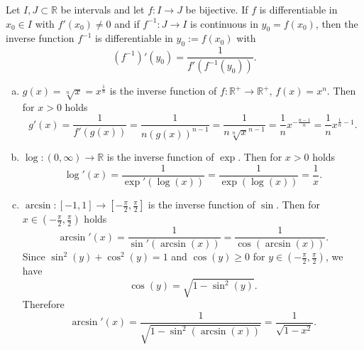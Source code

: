 

\begin{Theorem}
    Let $I,J\subset\mathbb{R}$ be intervals and let $f:I\to J$ be bijective. If $f$ is differentiable in $x_0\in I$ with $f'(x_0)\neq0$ 
and if $f^{-1}:J\to I$ is continuous in $y_0=f(x_0)$,
then the inverse function $f^{-1}$ is differentiable in $y_0:=f(x_0)$ with
\[\left(f^{-1}\right)'(y_0)=\frac{1}{f'(f^{-1}(y_0))}.\]
\end{Theorem}

\begin{example}
\begin{enumerate}[a)]
    \item $g(x)=\sqrt[n]{x}=x^{\frac{1}{n}}$ is the inverse function of $f:\mathbb{R}^+\to\mathbb{R}^+$, $f(x)=x^n$. Then for $x>0$ holds
\[g'(x)=\frac{1}{f'(g(x))}=\frac{1}{n(g(x))^{n-1}}=\frac{1}{n\sqrt[n]{x}^{n-1}}=\frac1nx^{-\frac{n-1}{n}}=\frac1nx^{\frac{1}{n}-1}.\]
\item $\log: (0,\infty)\to\mathbb{R}$ is the inverse function of $\exp$. Then for $x>0$ holds
\[\log'(x)=\frac1{\exp'(\log(x))}=\frac1{\exp(\log(x))}=\frac1{x}.\]
\item $\arcsin:[-1,1]\to[-\frac\pi2,\frac\pi2]$ is the inverse function of $\sin$. Then for 
$x\in (-\frac\pi2,\frac\pi2)$ holds
\[\arcsin'(x)=\frac1{\sin'(\arcsin(x))}=\frac1{\cos(\arcsin(x))}.\]
Since $\sin^2(y)+\cos^2(y)=1$ and $\cos(y)\geq0$ for $y\in (-\frac\pi2,\frac\pi2)$, we have
\[\cos(y)=\sqrt{1-\sin^2(y)}.\]
Therefore
\[\arcsin'(x)=\frac1{\sqrt{1-\sin^2(\arcsin(x))}}=\frac1{\sqrt{1-x^2}}.\]
\end{enumerate}
\end{example}

